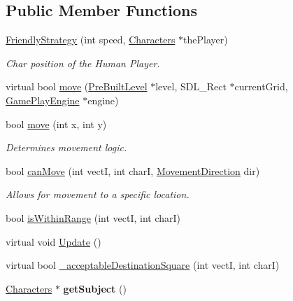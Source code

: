 \subsection*{Public Member Functions}
\begin{DoxyCompactItemize}
\item 
\hyperlink{class_friendly_strategy_a0a06f0fe84fd38cb762892eee051d44d}{Friendly\+Strategy} (int speed, \hyperlink{class_characters}{Characters} $\ast$the\+Player)
\begin{DoxyCompactList}\small\item\em Char position of the Human Player. \end{DoxyCompactList}\item 
virtual bool \hyperlink{class_friendly_strategy_a8d0ce840204e9fd240ee0613d04ef803}{move} (\hyperlink{class_pre_built_level}{Pre\+Built\+Level} $\ast$level, S\+D\+L\+\_\+\+Rect $\ast$current\+Grid, \hyperlink{class_game_play_engine}{Game\+Play\+Engine} $\ast$engine)
\item 
\hypertarget{class_friendly_strategy_a5ad535963dbf46c1034e01fcdc739ebd}{}\label{class_friendly_strategy_a5ad535963dbf46c1034e01fcdc739ebd} 
bool \hyperlink{class_friendly_strategy_a5ad535963dbf46c1034e01fcdc739ebd}{move} (int x, int y)
\begin{DoxyCompactList}\small\item\em Determines movement logic. \end{DoxyCompactList}\item 
bool \hyperlink{class_friendly_strategy_ac1f5837825bf7090d31c06f88f463e35}{can\+Move} (int vectI, int charI, \hyperlink{_movement_strategy_8h_a0b5e764f0ec9a407e9b8789f0259d754}{Movement\+Direction} dir)
\begin{DoxyCompactList}\small\item\em Allows for movement to a specific location. \end{DoxyCompactList}\item 
bool \hyperlink{class_friendly_strategy_a569177588c0dbf099988222eee8dc8cb}{is\+Within\+Range} (int vectI, int charI)
\item 
virtual void \hyperlink{class_friendly_strategy_a9758d387409a12ab2291c42e52313fcb}{Update} ()
\item 
virtual bool \hyperlink{class_friendly_strategy_a7490a78b29add77bb9485899b05661b4}{\+\_\+acceptable\+Destination\+Square} (int vectI, int charI)
\item 
\hypertarget{class_friendly_strategy_a1e937a36ea7c4c1a0324faec41cf5f2c}{}\label{class_friendly_strategy_a1e937a36ea7c4c1a0324faec41cf5f2c} 
\hyperlink{class_characters}{Characters} $\ast$ {\bfseries get\+Subject} ()
\end{DoxyCompactItemize}
